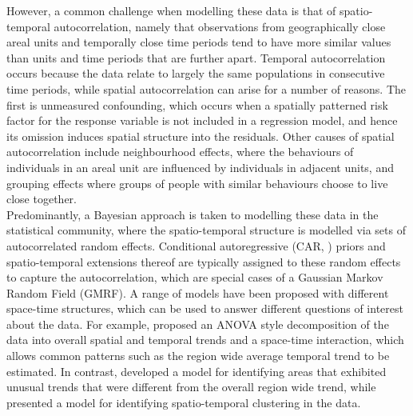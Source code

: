 \documentclass[article, nojss]{jss}
\begin{document}
However, a common challenge when modelling these data is that of spatio-temporal autocorrelation, namely that observations from geographically close areal units and temporally close time periods tend to have more similar values than units and time periods that are further apart. Temporal autocorrelation occurs because the data relate to largely the same populations in consecutive time periods, while spatial autocorrelation can arise for a number of reasons. The first is unmeasured confounding, which occurs when a spatially patterned risk factor for the response variable is not included in a regression  model, and hence its omission induces spatial structure into the residuals. Other causes of spatial autocorrelation include neighbourhood effects, where the behaviours of individuals in an areal unit  are influenced by individuals in adjacent units, and grouping effects where groups of people with similar behaviours choose to live close together.\\

Predominantly, a Bayesian approach is taken to modelling these data in the statistical community, where the spatio-temporal structure is modelled via sets of autocorrelated random effects. Conditional autoregressive (CAR, \citealp{besag1991}) priors and spatio-temporal extensions thereof  are typically assigned to these random effects to capture the autocorrelation, which are special cases of a Gaussian Markov Random Field (GMRF). A range of models have been proposed with different space-time structures, which can be used to answer different questions of interest about the data. For example, \cite{knorrheld2000} proposed an ANOVA style decomposition of the data into overall spatial and temporal trends and a space-time interaction, which allows common patterns such as the region wide average temporal trend to be estimated. In contrast, \cite{li2012} developed a model for identifying areas that exhibited unusual trends that were different from the overall region wide trend, while \cite{lee2016} presented a model for identifying spatio-temporal clustering in the data.\\
\end{document}
